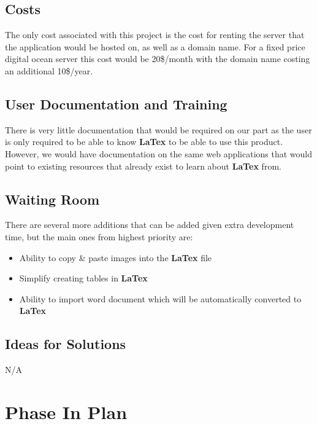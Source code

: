 \documentclass[12pt, titlepage]{article}
\begin{document}
	\subsection{Costs}
	
	The only cost associated with this project is the cost for renting the server that the application would be hosted on, as well as a domain name. For a fixed price digital ocean server this cost would be 20\$/month with the domain name costing an additional 10\$/year.
	
	\subsection{User Documentation and Training}
	
	There is very little documentation that would be required on our part as the user is only required to be able to know \textbf{LaTex} to be able to use this product. However, we would have documentation on the same web applications that would point to existing resources that already exist to learn about \textbf{LaTex} from.
	
	\subsection{Waiting Room}
	There are several more additions that can be added given extra development time, but the main ones from highest priority are:
	\begin{itemize}
		\item Ability to copy \& paste images into the \textbf{LaTex} file
		\item Simplify creating tables in \textbf{LaTex} 
		\item Ability to import word document which will be automatically converted to \textbf{LaTex}
	\end{itemize}
	
	\subsection{Ideas for Solutions}
	N/A
	
	\section{Phase In Plan}
	
\end{document}
